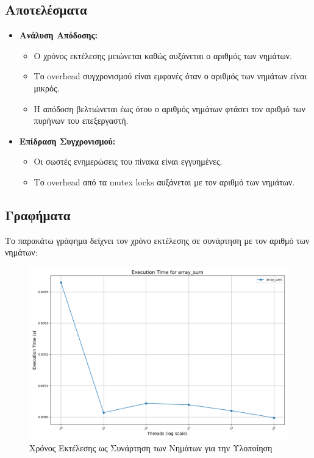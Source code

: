 \documentclass{article}
\begin{document}
\subsection*{Αποτελέσματα}
\begin{itemize}
    \item \textbf{Ανάλυση Απόδοσης:}
    \begin{itemize}
        \item Ο χρόνος εκτέλεσης μειώνεται καθώς αυξάνεται ο αριθμός των νημάτων.
        \item Το overhead συγχρονισμού είναι εμφανές όταν ο αριθμός των νημάτων είναι μικρός.
        \item Η απόδοση βελτιώνεται έως ότου ο αριθμός νημάτων φτάσει τον αριθμό των πυρήνων του επεξεργαστή.
    \end{itemize}
    \item \textbf{Επίδραση Συγχρονισμού:}
    \begin{itemize}
        \item Οι σωστές ενημερώσεις του πίνακα είναι εγγυημένες.
        \item Το overhead από τα mutex locks αυξάνεται με τον αριθμό των νημάτων.
    \end{itemize}
\end{itemize}
\subsection*{Γραφήματα}
Το παρακάτω γράφημα δείχνει τον χρόνο εκτέλεσης σε συνάρτηση με τον αριθμό των νημάτων:
\newpage
\begin{figure}[h]
    \centering
    \includegraphics[width=1\textwidth]{array_sum_results.png}
    \caption{Χρόνος Εκτέλεσης ως Συνάρτηση των Νημάτων για την Υλοποίηση \protect{}}
\end{figure}
\end{document}
